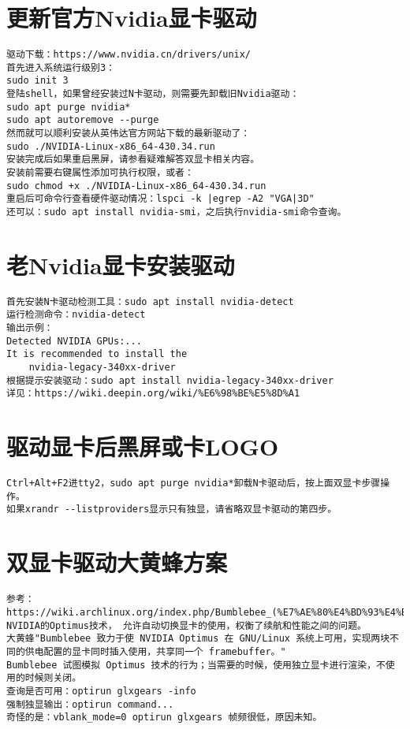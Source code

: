 \documentclass[a4paper,fontset=fandol,zihao=-4,linespread=1.2]{ctexbook}
\begin{document}
\section{更新官方Nvidia显卡驱动}
\begin{lstlisting}
驱动下载：https://www.nvidia.cn/drivers/unix/
首先进入系统运行级别3：
sudo init 3
登陆shell，如果曾经安装过N卡驱动，则需要先卸载旧Nvidia驱动：
sudo apt purge nvidia*
sudo apt autoremove --purge
然而就可以顺利安装从英伟达官方网站下载的最新驱动了：
sudo ./NVIDIA-Linux-x86_64-430.34.run
安装完成后如果重启黑屏，请参看疑难解答双显卡相关内容。
安装前需要右键属性添加可执行权限，或者：
sudo chmod +x ./NVIDIA-Linux-x86_64-430.34.run
重启后可命令行查看硬件驱动情况：lspci -k |egrep -A2 "VGA|3D"
还可以：sudo apt install nvidia-smi，之后执行nvidia-smi命令查询。
\end{lstlisting}

\section{老Nvidia显卡安装驱动}
\begin{lstlisting}
首先安装N卡驱动检测工具：sudo apt install nvidia-detect
运行检测命令：nvidia-detect
输出示例：
Detected NVIDIA GPUs:...
It is recommended to install the
    nvidia-legacy-340xx-driver
根据提示安装驱动：sudo apt install nvidia-legacy-340xx-driver
详见：https://wiki.deepin.org/wiki/%E6%98%BE%E5%8D%A1
\end{lstlisting}

\section{驱动显卡后黑屏或卡LOGO}
\begin{lstlisting}
Ctrl+Alt+F2进tty2，sudo apt purge nvidia*卸载N卡驱动后，按上面双显卡步骤操作。
如果xrandr --listproviders显示只有独显，请省略双显卡驱动的第四步。
\end{lstlisting}

\section{双显卡驱动大黄蜂方案}
\begin{lstlisting}
参考：https://wiki.archlinux.org/index.php/Bumblebee_(%E7%AE%80%E4%BD%93%E4%B8%AD%E6%96%87)
NVIDIA的Optimus技术， 允许自动切换显卡的使用，权衡了续航和性能之间的问题。
大黄蜂"Bumblebee 致力于使 NVIDIA Optimus 在 GNU/Linux 系统上可用，实现两块不同的供电配置的显卡同时插入使用，共享同一个 framebuffer。"
Bumblebee 试图模拟 Optimus 技术的行为；当需要的时候，使用独立显卡进行渲染，不使用的时候则关闭。
查询是否可用：optirun glxgears -info
强制独显输出：optirun command...
奇怪的是：vblank_mode=0 optirun glxgears 帧频很低，原因未知。
\end{lstlisting}
\end{document}
